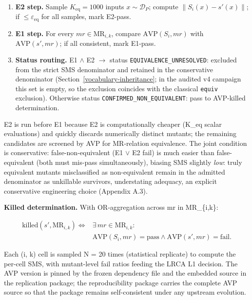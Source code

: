 \documentclass[manuscript,screen,review]{acmart}
\begin{document}
\begin{enumerate}

\item
  \textbf{E2 step.} Sample $K_{\mathrm{eq}} = 1000$ inputs
  $x \sim \mathcal{D}_P$; compute
  $\|S_i(x) - s'(x)\|$; if $\leq \varepsilon_{\mathrm{eq}}$ for all
  samples, mark E2-pass.
\item
  \textbf{E1 step.} For every $mr \in \mathrm{MR}_{i,k}$, compare
  $\mathrm{AVP}(S_i, mr)$ with $\mathrm{AVP}(s', mr)$;
  if all consistent, mark E1-pass.
\item
  \textbf{Status routing.} E1 $\wedge$ E2 $\to$ status
  \texttt{EQUIVALENCE\_UNRESOLVED}: excluded from the strict SMS
  denominator and retained in the conservative denominator
  (Section~\ref{vocabulary-inheritance}; in the audited v4 campaign
  this set is empty, so the exclusion coincides with the classical
  \texttt{equiv} exclusion). Otherwise status
  \texttt{CONFIRMED\_NON\_EQUIVALENT}: pass to AVP-killed
  determination.
\end{enumerate}

E2 is run before E1 because E2 is computationally cheaper (K\_eq scalar
evaluations) and quickly discards numerically distinct mutants; the
remaining candidates are screened by AVP for MR-relation equivalence.
The joint condition is conservative: false-non-equivalent (E1 $\vee$ E2 fail)
is much easier than false-equivalent (both must mis-pass
simultaneously), biasing SMS slightly \emph{low}: truly equivalent mutants misclassified
as non-equivalent remain in the admitted denominator as unkillable
survivors, understating adequacy, an explicit
conservative engineering choice (Appendix A.3).

\textbf{Killed determination.} With OR-aggregation across mr in
MR\_\{i,k\}:

\[
\begin{aligned}
\mathrm{killed}(s', \mathrm{MR}_{i,k}) \iff{} & \exists\,mr \in \mathrm{MR}_{i,k}: \\
& \mathrm{AVP}(S_i, mr) = \text{pass} \wedge
  \mathrm{AVP}(s', mr) = \text{fail}.
\end{aligned}
\]

Each (i, k) cell is sampled N = 20 times (statistical replicate) to
compute the per-cell SMS, with mutant-level fail ratios feeding the LRCA
L1 decision. The AVP version is pinned by the frozen dependency file and the
embedded source in the replication package; the reproducibility
package carries the complete AVP source so that the package remains
self-consistent under any upstream evolution.
\end{document}
